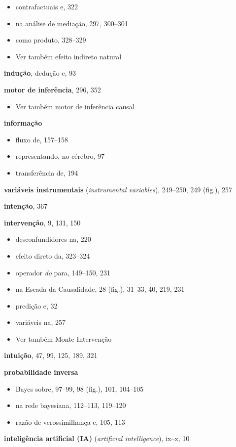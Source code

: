 \documentclass[11pt,a5paper,twoside]{book}
\begin{document}
\begin{itemize}
\item contrafactuais e, 322
\item na análise de mediação, 297, 300–301
\item como produto, 328–329
\item Ver também efeito indireto natural
\end{itemize}
\textbf{indução}, dedução e, 93

\textbf{motor de inferência}, 296, 352

\begin{itemize}
\item Ver também motor de inferência causal
\end{itemize}
\textbf{informação}

\begin{itemize}
\item fluxo de, 157–158
\item representando, no cérebro, 97
\item transferência de, 194
\end{itemize}
\textbf{variáveis instrumentais} (\textit{instrumental variables}), 249–250, 249 (fig.), 257

\textbf{intenção}, 367

\textbf{intervenção}, 9, 131, 150

\begin{itemize}
\item desconfundidores na, 220
\item efeito direto da, 323–324
\item operador \textit{do} para, 149–150, 231
\item na Escada da Causalidade, 28 (fig.), 31–33, 40, 219, 231
\item predição e, 32
\item variáveis na, 257
\item Ver também Monte Intervenção
\end{itemize}
\textbf{intuição}, 47, 99, 125, 189, 321

\textbf{probabilidade inversa}

\begin{itemize}
\item Bayes sobre, 97–99, 98 (fig.), 101, 104–105
\item na rede bayesiana, 112–113, 119–120
\item razão de verossimilhança e, 105, 113
\end{itemize}
\textbf{inteligência artificial (IA)} (\textit{artificial intelligence}), ix–x, 10
\end{document}
